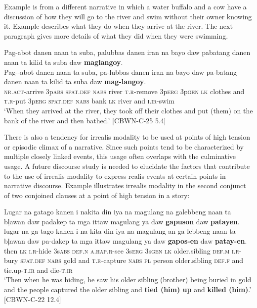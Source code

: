 Example  is from a different narrative in which a water buffalo and a cow have a discussion of how they will go to the river and swim without their owner knowing it. Example  describes what they do when they arrive at the river. The next paragraph gives more details of what they did when they were swimming. 

\ea
\label{ex:andthenbathed}
Pag-abot danen naan ta suba, palubbas danen iran na bayo daw pabatang danen naan ta kilid ta suba daw \textbf{maglangoy}.\\
\vspace{4pt} \gll Pag-{}-abot danen naan ta suba, pa-lubbas danen iran na bayo daw pa-batang danen naan ta kilid ta suba daw \textbf{mag-langoy}.\\
\textsc{nr.act}-arrive 3p\textsc{abs} \textsc{spat.def} \textsc{nabs} river \textsc{t.r}-remove 3p\textsc{erg} 3p\textsc{gen} \textsc{lk} clothes and \textsc{t.r}-put 3p\textsc{erg} \textsc{spat.def} \textsc{nabs} bank \textsc{lk} river and \textsc{i.ir}-swim \\
\glt ‘When they arrived at the river, they took off their clothes and put (them) on the bank of the river and then bathed.’ [CBWN-C-25 5.4] 
\z

There is also a tendency for irrealis modality to be used at points of high tension or episodic climax of a narrative. Since such points tend to be characterized by multiple closely linked events, this usage often overlaps with the culminative usage. A future discourse study is needed to elucidate the factors that contribute to the use of irrealis modality to express realis events at certain points in narrative discourse. Example  illustrates irrealis modality in the second conjunct of two conjoined clauses at a point of high tension in a story:

\ea
\label{ex:andkilledhim}
Lugar na gatago kanen i nakita din iya na magulang na galebbeng naan ta b\c{l}awan daw padakep ta mga ittaw magulang ya daw \textbf{gapuson} daw \textbf{patayen}. \\
\vspace{4pt} \gll lugar na ga-tago kanen i na-kita din iya na magulang an ga-lebbeng naan ta  b\c{l}awan daw pa-dakep ta mga ittaw magulang ya daw \textbf{gapos-en} daw \textbf{patay-en}. \\
then \textsc{lk} \textsc{i.r}-hide 3s\textsc{abs} \textsc{def.n} \textsc{a.hap.r}-see 3s\textsc{erg} 3s\textsc{gen} \textsc{lk} older.sibling \textsc{def.m} \textsc{i.r}-bury \textsc{spat.def} \textsc{nabs} gold and \textsc{t.r}-capture \textsc{nabs} \textsc{pl} person older.sibling \textsc{def.f} and tie.up-\textsc{t.ir} and die-\textsc{t.ir} \\
\glt ‘Then when he was hiding, he saw his older sibling (brother) being buried in gold and the people captured the older sibling and \textbf{tied (him) up} and \textbf{killed (him)}.’ [CBWN-C-22 12.4]
\z
